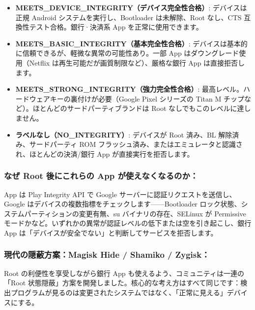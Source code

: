 \begin{itemize}
  \item \textbf{MEETS\_DEVICE\_INTEGRITY（デバイス完全性合格）}: デバイスは正規 Android システムを実行し、Bootloader は未解除、Root なし、CTS 互換性テスト合格。銀行·決済系 App を正常に使用できます。
  \item \textbf{MEETS\_BASIC\_INTEGRITY（基本完全性合格）}: デバイスは基本的に信頼できるが、軽微な異常の可能性あり。一部 App はダウングレード使用（Netflix は再生可能だが画質制限など）、厳格な銀行 App は直接拒否します。
  \item \textbf{MEETS\_STRONG\_INTEGRITY（強力完全性合格）}: 最高レベル。ハードウェアキーの裏付けが必要（Google Pixel シリーズの Titan M チップなど）。ほとんどのサードパーティブランドは Root なしでもこのレベルに達しません。
  \item \textbf{ラベルなし（NO\_INTEGRITY）}: デバイスが Root 済み、BL 解除済み、サードパーティ ROM フラッシュ済み、またはエミュレータと認識され、ほとんどの決済/銀行 App が直接実行を拒否します。
\end{itemize}

\subsubsection*{なぜ Root 後にこれらの App が使えなくなるのか：}

App は Play Integrity API で Google サーバーに認証リクエストを送信し、Google はデバイスの複数指標をチェックします——Bootloader ロック状態、システムパーティションの変更有無、su バイナリの存在、SELinux が Permissive モードかなど。いずれかの異常が認証レベルの低下または空を引き起こし、銀行 App は「デバイスが安全でない」と判断してサービスを拒否します。

\subsubsection*{現代の隠蔽方案：Magisk Hide / Shamiko / Zygisk：}

Root の利便性を享受しながら銀行 App も使えるよう、コミュニティは一連の「Root 状態隠蔽」方案を開発しました。核心的な考え方はすべて同じです：検出プログラムが見るのは変更されたシステムではなく、「正常に見える」デバイスにする。

